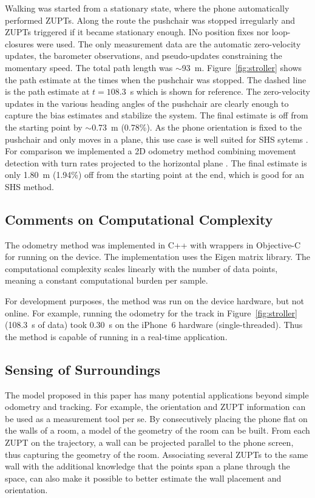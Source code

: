 \documentclass[conference]{ieeetran}
\begin{document}
Walking was started from a stationary state, where the phone automatically performed ZUPTs. Along the route the pushchair was stopped irregularly and ZUPTs triggered if it became stationary enough. INo position fixes nor loop-closures were used. The only measurement data are the automatic zero-velocity updates, the barometer observations, and pseudo-updates constraining the momentary speed. The total path length was {$\sim$}93~m.
Figure~\ref{fig:stroller} shows the path estimate at the times when the pushchair was stopped. The dashed line is the path estimate at $t=108.3$~s which is shown for reference. The zero-velocity updates in the various heading angles of the pushchair are clearly enough to capture the bias estimates and stabilize the system. The final estimate is off from the starting point by {$\sim$}0.73~m (0.78\%). 
As the phone orientation is fixed to the pushchair and only moves in a plane, this use case is well suited for SHS sytems \cite{Harle:2013}. For comparison we implemented a 2D odometry method combining movement detection with turn rates projected to the horizontal plane \cite{Sarkka+Tolvanen+Kannala+Rahtu:2015}. The final estimate is only 1.80~m (1.94\%) off from the starting point at the end, which is good for an SHS method.


\subsection{Comments on Computational Complexity}
\noindent
The odometry method was implemented in C++ with wrappers in Objective-C for running on the device. The implementation uses the Eigen matrix library. The computational complexity scales linearly with the number of data points, meaning a constant computational burden per sample.

For development purposes, the method was run on the device hardware, but not online. For example, running the odometry for the track in Figure~\ref{fig:stroller} (108.3~s of data) took 0.30~s on the iPhone~6 hardware (single-threaded). Thus the method is capable of running in a real-time application.


\subsection{Sensing of Surroundings}
\noindent
The model proposed in this paper has many potential applications beyond simple odometry and tracking. For example, the orientation and ZUPT information can be used as a measurement tool per se. By consecutively placing the phone flat on the walls of a room, a model of the geometry of the room can be built. From each ZUPT on the trajectory, a wall can be projected parallel to the phone screen, thus capturing the geometry of the room. Associating several ZUPTs to the same wall with the additional knowledge that the points span a plane through the space, can also make it possible to better estimate the wall placement and orientation.
\end{document}
